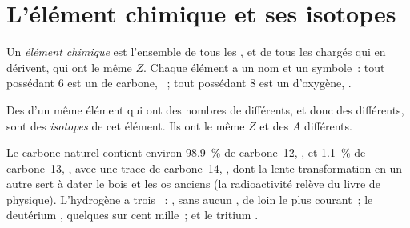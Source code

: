 \section{L'élément chimique et ses isotopes}

\begin{definition}\label{def:g9:inside-the-atom:element}
Un \emph{élément chimique} est l'ensemble de tous
les , et de tous les  chargés qui en dérivent, qui ont le
même  $Z$. Chaque élément a un nom et un symbole~: tout
 possédant 6  est un  de carbone, ~; tout 
possédant 8  est un  d'oxygène, .
\end{definition}

\begin{definition}[Isotopes]\label{def:g9:inside-the-atom:isotope}
Des  d'un même élément qui ont des nombres de  différents,
et donc des  différents, sont des
\emph{isotopes} de cet élément. Ils ont le même $Z$ et
des $A$ différents.
\end{definition}

\begin{example}\label{ex:g9:inside-the-atom:isotopes}
Le carbone naturel contient environ \qty{98.9}{\percent} de carbone~12,
, et \qty{1.1}{\percent} de carbone~13, ,
avec une trace de carbone~14, , dont la lente
transformation en un autre  sert à dater le bois et les os anciens
(la radioactivité relève du livre de physique). L'hydrogène a trois
~: , sans aucun , de loin le plus courant~;
le deutérium , quelques  sur cent mille~; et le
tritium .
\end{example}

